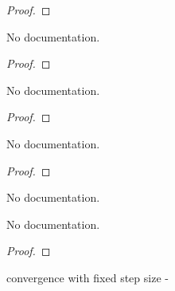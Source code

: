 \begin{proof}
    \leanok
\end{proof}

\begin{theorem}\label{bounded_subgradient_to_Lipschitz
}
        \leanok
                No documentation.
    \end{theorem}

\begin{proof}
    \leanok
\end{proof}

\begin{theorem}\label{Lipschitz_to_bounded_subgradient}
        \leanok
                No documentation.
    \end{theorem}

\begin{proof}
    \leanok
\end{proof}

\begin{theorem}\label{bounded_subgradient_iff_Lipschitz}
        \leanok
                No documentation.
    \end{theorem}

\begin{proof}
    \leanok
\end{proof}

\begin{definition}\label{subgradient_method}
        \leanok
                No documentation.
    \end{definition}

\begin{theorem}\label{subgradient_method_converge}
        \leanok
                No documentation.
    \end{theorem}

\begin{proof}
    \leanok
\end{proof}

\begin{theorem}\label{subgradient_method_fix_step_size}
        \leanok
                convergence with fixed step size -
    \end{theorem}

